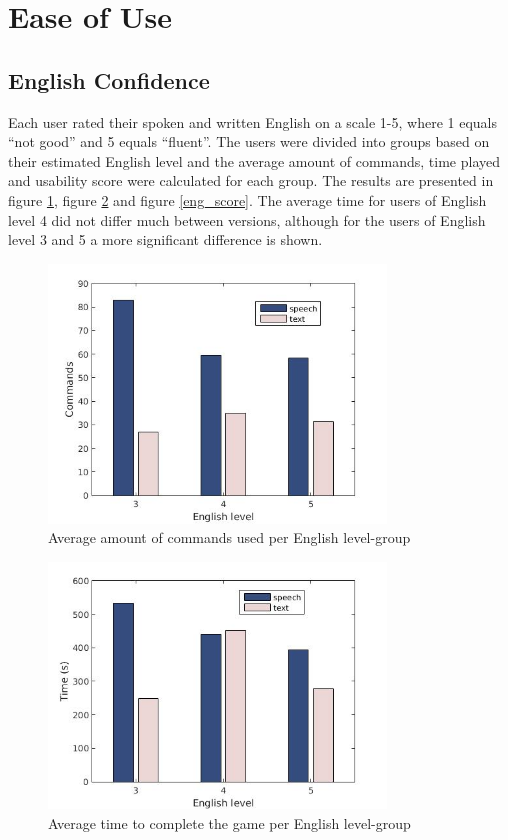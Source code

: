 \section{Ease of Use}
\subsection{English Confidence} \label{sec:eng_con}
Each user rated their spoken and written English on a scale 1-5, where 1 equals ``not good'' and 5 equals ``fluent''. The users were divided into groups based on their estimated English level and the average amount of commands, time played and usability score were calculated for each group. The results are presented in figure \ref{eng_cmd}, figure \ref{eng_time} and figure \ref{eng_score}. The average time for users of English level 4 did not differ much between versions, although for the users of English level 3 and 5 a more significant difference is shown.
\newpage
\begin{figure}[ht]
  \centering
  \includegraphics[width=0.8\textwidth]{images/english_cmd.jpg}
  \caption{Average amount of commands used per English level-group}\label{eng_cmd}
\end{figure}

\begin{figure}[H]
  \centering
  \includegraphics[width=0.8\textwidth]{images/english_time.jpg}
  \caption{Average time to complete the game per English level-group}\label{eng_time}
\end{figure}

